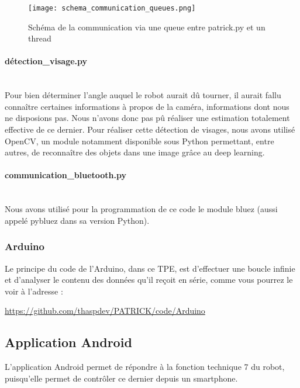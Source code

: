 \documentclass[12pt,a4paper]{article}
\begin{document}
	\begin{figure}[ht!]
		\centering
			\texttt{[image: schema\_communication\_queues.png]}
			\caption{Schéma de la communication via une queue entre patrick.py et un thread\label{overflow}}
	\end{figure}
	
	\paragraph{détection\_visage.py}\mbox{}\\
	
	Pour bien déterminer l'angle auquel le robot aurait dû tourner, il aurait fallu connaître certaines informations à propos de la caméra, informations dont nous ne disposions pas. Nous n'avons donc pas pû réaliser une estimation totalement effective de ce dernier. Pour réaliser cette détection de visages, nous avons utilisé OpenCV, un module notamment disponible sous Python permettant, entre autres, de reconnaître des objets dans une image grâce au deep learning.
	
	\paragraph{communication\_bluetooth.py}\mbox{}\\
	
	Nous avons utilisé pour la programmation de ce code le module bluez (aussi appelé pybluez dans sa version Python).
	
	
	\subsubsection{Arduino}
	
\indent\indent Le principe du code de l'Arduino, dans ce TPE, est d'effectuer une boucle infinie et d'analyser le contenu des données qu'il reçoit en série, comme vous pourrez le voir à l'adresse :
	
	\begin{center}
		\url{https://github.com/thaspdev/PATRICK/code/Arduino}
	\end{center}

\subsection{Application Android}

\indent\indent L'application Android permet de répondre à la fonction technique 7 du robot, puisqu'elle permet de contrôler ce dernier depuis un smartphone.
\end{document}
